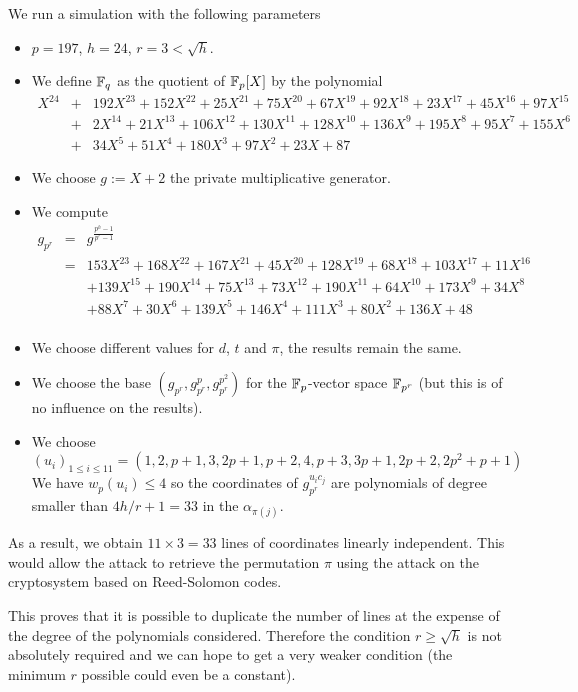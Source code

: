 \documentclass[12pt,a4paper,titlepage]{article}
\begin{document}
We run a simulation with the following parameters
\begin{itemize}
\item $p = 197$, $h = 24$, $r = 3 < \sqrt{h}$.
\item We define $\mathbb{F}_q$ as the quotient of $\mathbb{F}_p[X]$ by the polynomial
\begin{eqnarray*}
X^{24} &+& 192X^{23} + 152X^{22} + 25X^{21} + 75X^{20} + 67X^{19} + 92X^{18} + 23X^{17} + 45X^{16} + 97X^{15} \\
 &+& 2X^{14} + 21X^{13} + 106X^{12} + 130X^{11} + 128X^{10} + 136X^9 + 195X^8 + 95X^7 + 155X^6 \\
 &+& 34X^5 + 51X^4 + 180X^3 + 97X^2 + 23X + 87
\end{eqnarray*}
\item We choose $g := X + 2$ the private multiplicative generator.
\item We compute
\begin{eqnarray*}
g_{p^r} &=& g^{\frac{p^h-1}{p^r-1}} \\
&=& 153X^{23} + 168X^{22} + 167X^{21} + 45X^{20} + 128X^{19} + 68X^{18} + 103X^{17} + 11X^{16}\\
&&+ 139X^{15} + 190X^{14} + 75X^{13} + 73X^{12} + 190X^{11} + 64X^{10} + 173X^9 + 34X^8 \\
&&+ 88X^7 + 30X^6 + 139X^5 + 146X^4 + 111X^3 + 80X^2 + 136X + 48\\
\end{eqnarray*}
\item We choose different values for $d$, $t$ and $\pi$, the results remain the same.
\item We choose the base $\left(g_{p^r}, g_{p^r}^p, g_{p^r}^{p^2} \right)$ for the $\mathbb{F}_p$-vector space $\mathbb{F}_{p^r}$ (but this is of no influence on the results).
\item We choose $(u_i)_{1\leq  i \leq 11} = (1,2,p+1,3,2p+1,p+2,4,p+3,3p+1,2p+2,2p^2+p+1)$\\
We have $w_p(u_i) \leq 4$ so the coordinates of $g_{p^r}^{u_i c_j}$ are polynomials of degree smaller than $4 h/r+1 = 33$ in the $\alpha_{\pi(j)}$.
\end{itemize}
As a result, we obtain $11 \times 3 = 33$ lines of coordinates linearly independent. This would allow the attack to retrieve the permutation $\pi$ using the attack on the cryptosystem based on Reed-Solomon codes.

This proves that it is possible to duplicate the number of lines at the expense of the degree of the polynomials considered. Therefore the condition $r \geq \sqrt{h}$ is not absolutely required and we can hope to get a very weaker condition (the minimum $r$ possible could even be a constant). 
\end{document}
